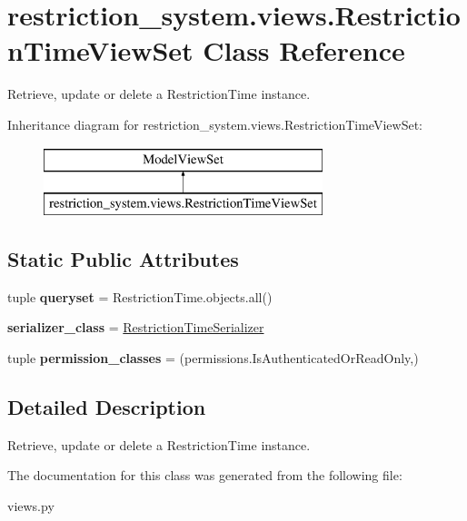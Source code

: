 \hypertarget{classrestriction__system_1_1views_1_1RestrictionTimeViewSet}{}\section{restriction\+\_\+system.\+views.\+Restriction\+Time\+View\+Set Class Reference}
\label{classrestriction__system_1_1views_1_1RestrictionTimeViewSet}


Retrieve, update or delete a Restriction\+Time instance.  


Inheritance diagram for restriction\+\_\+system.\+views.\+Restriction\+Time\+View\+Set\+:\begin{figure}[H]
\begin{center}
\leavevmode
\includegraphics[height=2.000000cm]{classrestriction__system_1_1views_1_1RestrictionTimeViewSet}
\end{center}
\end{figure}
\subsection*{Static Public Attributes}
\begin{DoxyCompactItemize}
\item 
\hypertarget{classrestriction__system_1_1views_1_1RestrictionTimeViewSet_a762d420073a2ecf80c3c2aeee7fc0639}{}tuple {\bfseries queryset} = Restriction\+Time.\+objects.\+all()\label{classrestriction__system_1_1views_1_1RestrictionTimeViewSet_a762d420073a2ecf80c3c2aeee7fc0639}

\item 
\hypertarget{classrestriction__system_1_1views_1_1RestrictionTimeViewSet_a10dadd16c668e7c37aaf80c894db2132}{}{\bfseries serializer\+\_\+class} = \hyperlink{classrestriction__system_1_1serializers_1_1RestrictionTimeSerializer}{Restriction\+Time\+Serializer}\label{classrestriction__system_1_1views_1_1RestrictionTimeViewSet_a10dadd16c668e7c37aaf80c894db2132}

\item 
\hypertarget{classrestriction__system_1_1views_1_1RestrictionTimeViewSet_a50bea99f1f442c041dbca55aa3545e69}{}tuple {\bfseries permission\+\_\+classes} = (permissions.\+Is\+Authenticated\+Or\+Read\+Only,)\label{classrestriction__system_1_1views_1_1RestrictionTimeViewSet_a50bea99f1f442c041dbca55aa3545e69}

\end{DoxyCompactItemize}


\subsection{Detailed Description}
Retrieve, update or delete a Restriction\+Time instance. 



The documentation for this class was generated from the following file\+:\begin{DoxyCompactItemize}
\item 
views.\+py\end{DoxyCompactItemize}
